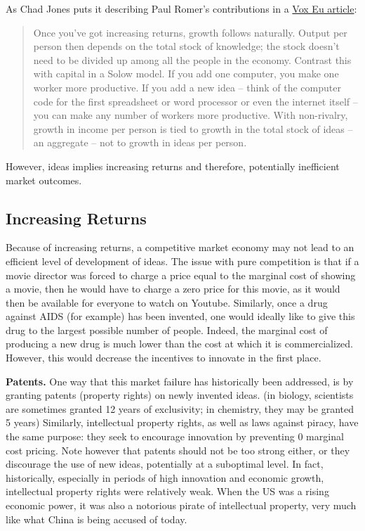 \documentclass[]{book}
\theoremstyle{definition}
\theoremstyle{definition}
\theoremstyle{definition}
\theoremstyle{remark}
\begin{document}
As Chad Jones puts it describing Paul Romer's contributions in a
\href{https://voxeu.org/article/new-ideas-about-new-ideas-paul-romer-nobel-laureate}{Vox
Eu article}:

\begin{quote}
Once you've got increasing returns, growth follows naturally. Output per
person then depends on the total stock of knowledge; the stock doesn't
need to be divided up among all the people in the economy. Contrast this
with capital in a Solow model. If you add one computer, you make one
worker more productive. If you add a new idea -- think of the computer
code for the first spreadsheet or word processor or even the internet
itself -- you can make any number of workers more productive. With
non-rivalry, growth in income per person is tied to growth in the total
stock of ideas -- an aggregate -- not to growth in ideas per person.
\end{quote}

However, ideas implies increasing returns and therefore, potentially
inefficient market outcomes.

\subsection{Increasing Returns}\label{increasing-returns}

Because of increasing returns, a competitive market economy may not lead
to an efficient level of development of ideas. The issue with pure
competition is that if a movie director was forced to charge a price
equal to the marginal cost of showing a movie, then he would have to
charge a zero price for this movie, as it would then be available for
everyone to watch on Youtube. Similarly, once a drug against AIDS (for
example) has been invented, one would ideally like to give this drug to
the largest possible number of people. Indeed, the marginal cost of
producing a new drug is much lower than the cost at which it is
commercialized. However, this would decrease the incentives to innovate
in the first place.

\textbf{Patents.} One way that this market failure has historically been
addressed, is by granting patents (property rights) on newly invented
ideas. (in biology, scientists are sometimes granted 12 years of
exclusivity; in chemistry, they may be granted 5 years) Similarly,
intellectual property rights, as well as laws against piracy, have the
same purpose: they seek to encourage innovation by preventing 0 marginal
cost pricing. Note however that patents should not be too strong either,
or they discourage the use of new ideas, potentially at a suboptimal
level. In fact, historically, especially in periods of high innovation
and economic growth, intellectual property rights were relatively weak.
When the US was a rising economic power, it was also a notorious pirate
of intellectual property, very much like what China is being accused of
today.
\end{document}
